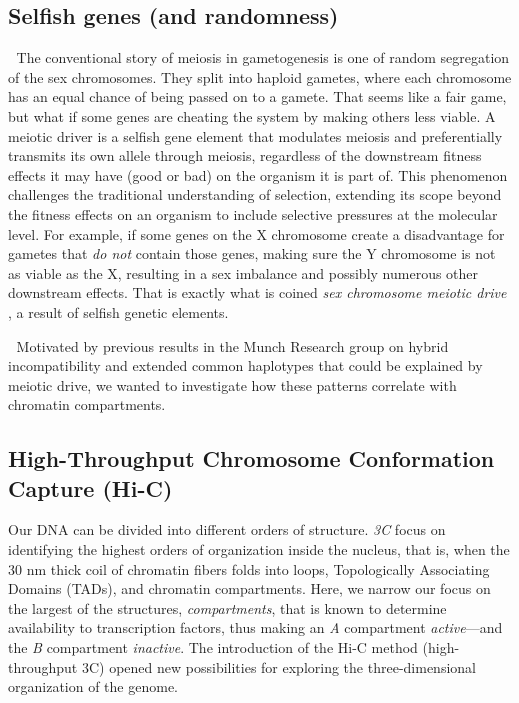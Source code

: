 \documentclass[
  a4paper,
  DIV=11,
  numbers=noendperiod]{scrartcl}
\renewenvironment{quote}{\begin{myquote}}{\end{myquote}}
\begin{document}
\subsection{Selfish genes (and
randomness)}\label{selfish-genes-and-randomness}

{📝} The conventional story of meiosis in gametogenesis is one of random
segregation of the sex chromosomes. They split into haploid gametes,
where each chromosome has an equal chance of being passed on to a
gamete. That seems like a fair game, but what if some genes are cheating
the system by making others less viable. A meiotic driver is a selfish
gene element that modulates meiosis and preferentially transmits its own
allele through meiosis, regardless of the downstream fitness effects it
may have (good or bad) on the organism it is part of. This phenomenon
challenges the traditional understanding of selection, extending its
scope beyond the fitness effects on an organism to include selective
pressures at the molecular level. For example, if some genes on the X
chromosome create a disadvantage for gametes that \emph{do not} contain
those genes, making sure the Y chromosome is not as viable as the X,
resulting in a sex imbalance and possibly numerous other downstream
effects. That is exactly what is coined \emph{sex chromosome meiotic
drive} \citep{jaenike_sex_2001}, a result of selfish genetic elements.

\begin{quote}
{📝} Motivated by previous results in the Munch Research group
\citep{munch_group_2024} on hybrid incompatibility and extended common
haplotypes \citep{skov_extraordinary_2023, sorensen_genome_wide_2023}
that could be explained by meiotic drive, we wanted to investigate how
these patterns correlate with chromatin compartments.
\end{quote}

\subsection{High-Throughput Chromosome Conformation Capture
(Hi-C)}\label{high-throughput-chromosome-conformation-capture-hi-c}

Our DNA can be divided into different orders of structure. \emph{3C}
focus on identifying the highest orders of organization inside the
nucleus, that is, when the 30 nm thick coil of chromatin fibers folds
into loops, Topologically Associating Domains (TADs), and chromatin
compartments. Here, we narrow our focus on the largest of the
structures, \emph{compartments}, that is known to determine availability
to transcription factors, thus making an \emph{A} compartment
\emph{active}---and the \emph{B} compartment \emph{inactive}. The
introduction of the Hi-C method
\citep{lieberman_aiden_comprehensive_2009} (high-throughput 3C) opened
new possibilities for exploring the three-dimensional organization of
the genome.
\end{document}
